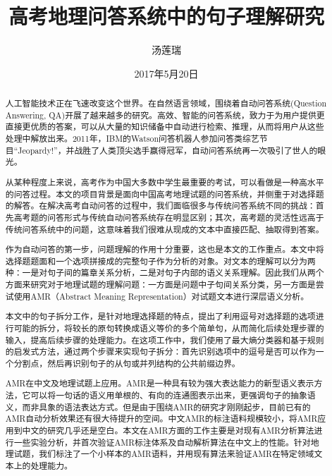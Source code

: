 \documentclass[master, winfont]{njuthesis}
\title{高考地理问答系统中的句子理解研究}
\author{汤莲瑞}
\institute{南京大学}
\date{2017年5月20日}
\begin{document}

\maketitle
\makeenglishtitle


\frontmatter

\begin{abstract}
人工智能技术正在飞速改变这个世界。在自然语言领域，围绕着自动问答系统(Question Answering, QA)开展了越来越多的研究。高效、智能的问答系统，致力于为用户提供更直接更优质的答案，可以从大量的知识储备中自动进行检索、推理，从而将用户从这些处理中解放出来。2011年，IBM的Watson问答机器人参加问答类综艺节目“Jeopardy!”，并战胜了人类顶尖选手赢得冠军，自动问答系统再一次吸引了世人的眼光。

从某种程度上来说，高考作为中国大多数中学生最重要的考试，可以看做是一种高水平的问答过程。本文的项目背景是面向中国高考地理试题的问答系统，并侧重于对选择题的解答。在解决高考自动问答的过程中，我们面临很多与传统问答系统不同的挑战：首先高考题的问答形式与传统自动问答系统存在明显区别；其次，高考题的灵活性远高于传统问答系统中的问题，这意味着我们很难从现成的文本中直接匹配、抽取得到答案。

作为自动问答的第一步，问题理解的作用十分重要，这也是本文的工作重点。本文中将选择题题面和一个选项拼接成的完整句子作为分析的对象。对文本的理解可以分为两种：一是对句子间的篇章关系分析，二是对句子内部的语义关系理解。因此我们从两个方面来研究对于地理试题的理解问题：一方面是问题中子句间关系分类，另一方面是尝试使用AMR（Abstract Meaning Representation）对试题文本进行深层语义分析。

本文中的句子拆分工作，是针对地理选择题的特点，提出了利用逗号对选择题的选项进行可能的拆分，将较长的原句转换成语义等价的多个简单句，从而简化后续处理步骤的输入，提高后续步骤的处理能力。在这项工作中，我们使用了最大熵分类器和基于规则的启发式方法，通过两个步骤来实现句子拆分：首先识别选项中的逗号是否可以作为一个分割点，然后再识别句子的从句或并列结构的公共前缀边界。

AMR在中文及地理试题上应用。AMR是一种具有较为强大表达能力的新型语义表示方法，它可以将一句话的语义用单根的、有向的连通图表示出来，更强调句子的抽象语义，而非具象的语法表达方式。但是由于围绕AMR的研究才刚刚起步，目前已有的AMR自动分析效果还有很大待提升的空间。中文AMR的标注语料规模较小，将AMR应用到中文的研究几乎还是空白。本文在AMR方面的工作主要是对现有AMR分析算法进行一些实验分析，并首次验证AMR标注体系及自动解析算法在中文上的性能。针对地理试题，我们标注了一个小样本的AMR语料，并用现有算法来验证AMR在特定领域文本上的处理能力。


\end{abstract}
\end{document}
